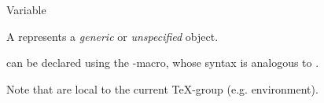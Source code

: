 \documentclass{stex}
\begin{document}
  \begin{smodule}[title=\sTeX-Variables]{Variable}

    \begin{sparagraph}[style={defibox,symdoc},name=variable]
        A  represents a \emph{generic}
        or \emph{unspecified} object.

         can be declared using the -macro,
        whose syntax is analogous to .
        
        Note that  are local to the current \TeX-group
        (e.g. environment).
    \end{sparagraph}
    
  \end{smodule}
\end{document}
